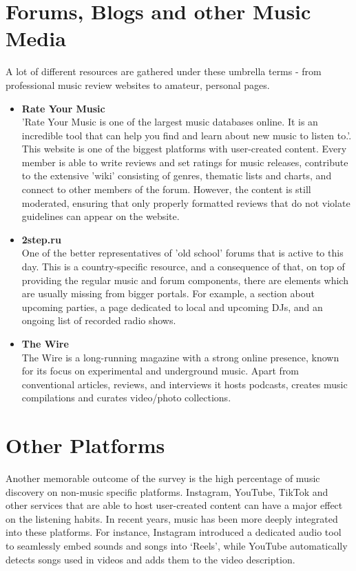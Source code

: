 \section{Forums, Blogs and other Music Media}
A lot of different resources are gathered under these umbrella terms - from professional music review websites to
amateur, personal pages.

\begin{itemize}
    \item \textbf{Rate Your Music} \\
    'Rate Your Music is one of the largest music databases online. It is an incredible tool that
    can help you find and learn about new music to listen to.'\cite{ryt}.\\
    This website is one of the biggest platforms with user-created content.
    Every member is able to write reviews and set ratings for music releases,
    contribute to the extensive 'wiki' consisting of genres, thematic lists and charts,
    and connect to other members of the forum. However, the content is still moderated,
    ensuring that only properly formatted reviews that do not violate guidelines can appear on the website.

    \item \textbf{2step.ru} \\
    One of the better representatives of 'old school' forums that is active to this day.
    This is a country-specific resource, and a consequence of that,
    on top of providing the regular music and forum components, there are elements which are usually missing
    from bigger portals. For example, a section about upcoming parties,
    a page dedicated to local and upcoming DJs, and an ongoing list of recorded radio shows.\cite{2step}

    \item \textbf{The Wire} \\
    The Wire is a long-running magazine with a strong online presence,
    known for its focus on experimental and underground music.
    Apart from conventional articles, reviews, and interviews it hosts podcasts, creates music compilations and curates
    video/photo collections.\cite{thewire}
\end{itemize}


\section{Other Platforms}
Another memorable outcome of the survey is the high percentage of music discovery on non-music specific platforms.
Instagram, YouTube, TikTok and other services that are able to host user-created content can have a major effect on
the listening habits. In recent years, music has been more deeply integrated into these platforms.
For instance, Instagram introduced a dedicated audio tool to seamlessly embed sounds and songs into ‘Reels’\cite{inst_audio},
while YouTube automatically detects songs used in videos and adds them to the video description.


